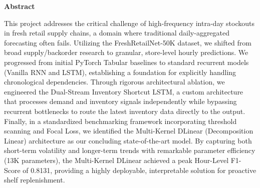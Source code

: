 \documentclass[12pt,phd,times]{pkmthesis}
\begin{document}
\setcounter{page}{1}   %
\onehalfspacing                              %
%

\thispagestyle{empty}

\thispagestyle{empty}

\clearpage
\thispagestyle{empty}
%
\newpage
\thispagestyle{empty}
\clearpage
\thispagestyle{empty}

\newpage
\thispagestyle{empty}
\clearpage

\thispagestyle{empty}

\thispagestyle{empty}
\clearpage

\thispagestyle{empty}
%
{\renewcommand{\baselinestretch}{1.5}
{%
\begin{center}
	{\bf{Abstract}}
\end{center}
{\em{\noindent 
This project addresses the critical challenge of high-frequency intra-day stockouts in fresh retail supply chains, a domain where traditional daily-aggregated forecasting often fails. Utilizing the FreshRetailNet-50K dataset, we shifted from broad supply/backorder research to granular, store-level hourly predictions. We progressed from initial PyTorch Tabular baselines to standard recurrent models (Vanilla RNN and LSTM), establishing a foundation for explicitly handling chronological dependencies. Through rigorous architectural ablation, we engineered the Dual-Stream Inventory Shortcut LSTM, a custom architecture that processes demand and inventory signals independently while bypassing recurrent bottlenecks to route the latest inventory data directly to the output. Finally, in a standardized benchmarking framework incorporating threshold scanning and Focal Loss, we identified the Multi-Kernel DLinear (Decomposition Linear) architecture as our concluding state-of-the-art model. By capturing both short-term volatility and longer-term trends with remarkable parameter efficiency (13K parameters), the Multi-Kernel DLinear achieved a peak Hour-Level F1-Score of 0.8131, providing a highly deployable, interpretable solution for proactive shelf replenishment.

	}}}}	
\thispagestyle{empty}
\clearpage
\end{document}
